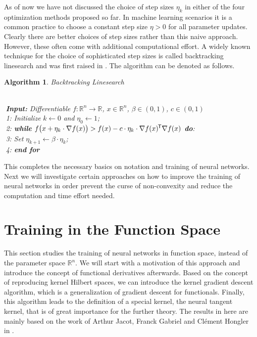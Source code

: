 \documentclass[11pt, a4paper]{article}
\newtheorem{algorithm}[theorem]{Algorithm}
\newcommand{\R}{\mathbb{R}}
\newcommand*{\tr}{^{\mkern-1.5mu\mathsf{T}}}
\begin{document}

As of now we have not discussed the choice of step sizes $\eta_k$ in either of the four optimization methods proposed so far. In machine learning scenarios it is a common practice to choose a constant step size $\eta > 0$ for all parameter updates. Clearly there are better choices of step sizes rather than this naive approach. However, these often come with additional computational effort. A widely known technique for the choice of sophisticated step sizes is called backtracking linesearch and was first raised in \cite{Armijo}. The algorithm can be denoted as follows. 
\begin{algorithm} 
\caption{Backtracking Linesearch \textcolor{white}{$\Big |$}} \ \\
\textcolor{white}{$\Big |$}\textbf{Input:} Differentiable $f: \R^n \to \R$, $x \in \R^n$, $\beta \in (0,1)$, $c \in (0,1)$ \\ 
\textcolor{white}{$\Big |$}1: Initialize $k \leftarrow 0$ and $\eta_0 \leftarrow 1$; \\
\textcolor{white}{$\Big |$}2: \textbf{while} $f \big (x + \eta_k \cdot \nabla f(x) \big) > f(x) - c \cdot \eta_k \cdot \nabla f(x) \tr \nabla f(x)$ \textbf{do}: \\
\textcolor{white}{$\Big |$}3: \quad Set $\eta_{k+1} \leftarrow \beta \cdot \eta_k$; \\
\textcolor{white}{$\Big |$}4: \textbf{end for}
\end{algorithm}

This completes the necessary basics on notation and training of neural networks. Next we will investigate certain approaches on how to improve the training of neural networks in order prevent the curse of non-convexity and reduce the computation and time effort needed. \\

\pagebreak
\section{Training in the Function Space} \label{sec:functionspace}

This section studies the training of neural networks in function space, instead of the parameter space $\R^n$. We will start with a motivation of this approach and introduce the concept of functional derivatives afterwards. Based on the concept of reproducing kernel Hilbert spaces, we can introduce the kernel gradient descent algorithm, which is a generalization of gradient descent for functionals. Finally, this algorithm leads to the definition of a special kernel, the neural tangent kernel, that is of great importance for the further theory. The results in here are mainly based on the work of Arthur Jacot, Franck Gabriel and Cl\'{e}ment Hongler in \cite{NTK}.
\end{document}

